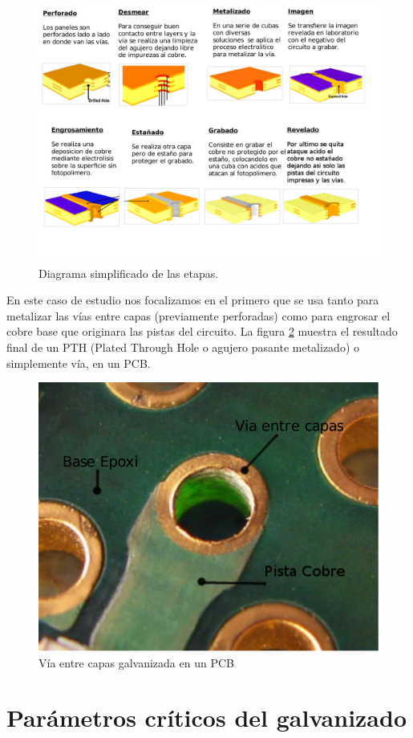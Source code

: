 \begin{figure}[h]
	\centering
	\includegraphics[width=1.0\textwidth]{Figures/Cap_2/diagrama_galvanizado_completo}
	\caption{Diagrama simplificado de las etapas.}
	\label{fig:diagrama_proceso}
\end{figure}

En este caso de estudio nos focalizamos en el primero que se usa tanto para metalizar las vías entre capas (previamente perforadas) como para engrosar el cobre base que originara las pistas del circuito. La figura \ref{fig:galvanizado_pcb} muestra el resultado final de un PTH (Plated Through Hole o agujero pasante metalizado) o simplemente vía, en un PCB.

\begin{figure}[h]
	\centering
	\includegraphics[width=.5\textwidth]{Figures/Cap_2/galvanizado_pcb}
	\caption{Vía entre capas galvanizada en un PCB}
	\label{fig:galvanizado_pcb}
\end{figure}

\section{ Parámetros críticos del galvanizado }

